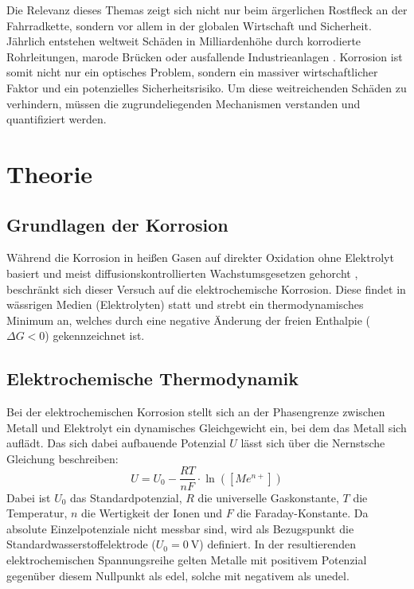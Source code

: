 \documentclass[11pt,a4paper]{article}
\numberwithin{equation}{section}
\begin{document}
\noindent Die Relevanz dieses Themas zeigt sich nicht nur beim ärgerlichen Rostfleck an der Fahrradkette, sondern vor allem in der globalen Wirtschaft und Sicherheit. Jährlich entstehen weltweit Schäden in Milliardenhöhe durch korrodierte Rohrleitungen, marode Brücken oder ausfallende Industrieanlagen \cite{nace_impact_2016}. Korrosion ist somit nicht nur ein optisches Problem, sondern ein massiver wirtschaftlicher Faktor und ein potenzielles Sicherheitsrisiko.
\noindent Um diese weitreichenden Schäden zu verhindern, müssen die zugrundeliegenden Mechanismen verstanden und quantifiziert werden.

\section{Theorie}

\subsection{Grundlagen der Korrosion}
Während die Korrosion in heißen Gasen auf direkter Oxidation ohne Elektrolyt basiert und meist diffusionskontrollierten Wachstumsgesetzen gehorcht \cite{tostmann2001korrosion}, beschränkt sich dieser Versuch auf die elektrochemische Korrosion. Diese findet in wässrigen Medien (Elektrolyten) statt und strebt ein thermodynamisches Minimum an, welches durch eine negative Änderung der freien Enthalpie ($\Delta G < 0$) gekennzeichnet ist. 

\subsection{Elektrochemische Thermodynamik}
Bei der elektrochemischen Korrosion stellt sich an der Phasengrenze zwischen Metall und Elektrolyt ein dynamisches Gleichgewicht ein, bei dem das Metall sich auflädt. Das sich dabei aufbauende Potenzial $U$ lässt sich über die Nernstsche Gleichung beschreiben:
\begin{equation}
    U = U_0 - \frac{R T}{n F} \cdot \ln\left([Me^{n+}]\right)
    \label{eq:nernst}
\end{equation}
Dabei ist $U_0$ das Standardpotenzial, $R$ die universelle Gaskonstante, $T$ die Temperatur, $n$ die Wertigkeit der Ionen und $F$ die Faraday-Konstante. Da absolute Einzelpotenziale nicht messbar sind, wird als Bezugspunkt die Standardwasserstoffelektrode ($U_0 = \qty{0}{\volt}$) definiert. In der resultierenden elektrochemischen Spannungsreihe gelten Metalle mit positivem Potenzial gegenüber diesem Nullpunkt als edel, solche mit negativem als unedel. 
\end{document}
